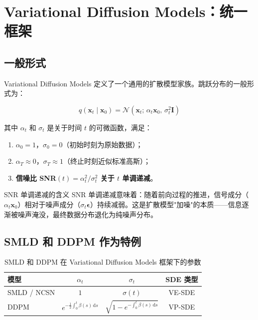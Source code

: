 \section{Variational Diffusion Models：统一框架}

\subsection{一般形式}

Variational Diffusion Models 定义了一个通用的扩散模型家族。跳跃分布的一般形式为：

$$
q(\mathbf{x}_t \mid \mathbf{x}_0) = \mathcal{N}\!\left(\mathbf{x}_t;\, \alpha_t \mathbf{x}_0,\, \sigma_t^2 \mathbf{I}\right)
$$

其中 $\alpha_t$ 和 $\sigma_t$ 是关于时间 $t$ 的可微函数，满足：

\begin{enumerate}
    \item $\alpha_0 = 1$，$\sigma_0 = 0$（初始时刻为原始数据）；
    \item $\alpha_T \approx 0$，$\sigma_T \approx 1$（终止时刻近似标准高斯）；
    \item \textbf{信噪比 SNR$(t) = \alpha_t^2/\sigma_t^2$ 关于 $t$ 单调递减}。
\end{enumerate}

\begin{importantbox}{SNR 单调递减的含义}
SNR 单调递减意味着：随着前向过程的推进，信号成分（$\alpha_t \mathbf{x}_0$）相对于噪声成分（$\sigma_t \boldsymbol{\epsilon}$）持续减弱。这是扩散模型"加噪"的本质——信息逐渐被噪声淹没，最终数据分布退化为纯噪声分布。
\end{importantbox}

\subsection{SMLD 和 DDPM 作为特例}

\begin{table}[H]
\centering
\begin{tabular}{lccc}
\toprule
\textbf{模型} & $\alpha_t$ & $\sigma_t$ & \textbf{SDE 类型} \\
\midrule
SMLD / NCSN & $1$ & $\sigma(t)$ & VE-SDE \\
DDPM & $e^{-\frac{1}{2}\int_0^t \beta(s)\,\mathrm{d}s}$ & $\sqrt{1 - e^{-\int_0^t \beta(s)\,\mathrm{d}s}}$ & VP-SDE \\
\bottomrule
\end{tabular}
\caption{SMLD 和 DDPM 在 Variational Diffusion Models 框架下的参数}
\end{table}

